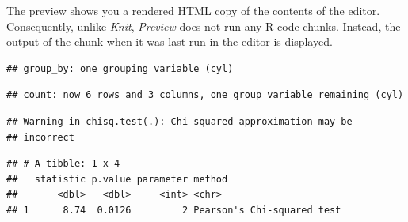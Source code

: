 \documentclass[
]{book}
\newenvironment{Shaded}{\begin{snugshade}}{\end{snugshade}}
\newcommand{\DataTypeTok}[1]{\textcolor[rgb]{0.13,0.29,0.53}{#1}}
\newcommand{\DecValTok}[1]{\textcolor[rgb]{0.00,0.00,0.81}{#1}}
\newcommand{\KeywordTok}[1]{\textcolor[rgb]{0.13,0.29,0.53}{\textbf{#1}}}
\newcommand{\NormalTok}[1]{#1}
\newcommand{\OperatorTok}[1]{\textcolor[rgb]{0.81,0.36,0.00}{\textbf{#1}}}
\newcommand{\StringTok}[1]{\textcolor[rgb]{0.31,0.60,0.02}{#1}}
\begin{document}
The preview shows you a rendered HTML copy of the contents of the editor. Consequently, unlike \emph{Knit}, \emph{Preview} does not run any R code chunks. Instead, the output of the chunk when it was last run in the editor is displayed.

\begin{Shaded}
\end{Shaded}

\begin{verbatim}
## group_by: one grouping variable (cyl)
\end{verbatim}

\begin{verbatim}
## count: now 6 rows and 3 columns, one group variable remaining (cyl)
\end{verbatim}

\begin{verbatim}
## Warning in chisq.test(.): Chi-squared approximation may be
## incorrect
\end{verbatim}

\begin{verbatim}
## # A tibble: 1 x 4
##   statistic p.value parameter method                    
##       <dbl>   <dbl>     <int> <chr>                     
## 1      8.74  0.0126         2 Pearson's Chi-squared test
\end{verbatim}

\begin{Shaded}
\end{Shaded}
\end{document}
